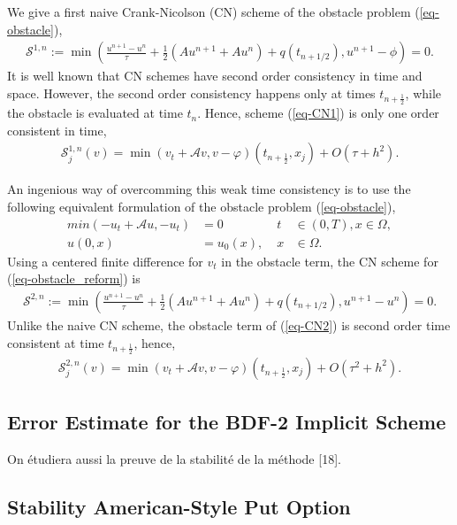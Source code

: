 \documentclass[12pt,a4paper]{article}
\begin{document}
We give a first naive Crank-Nicolson (CN) scheme of the obstacle problem (\ref{eq-obstacle}),
\begin{align}
\mathcal{S}^{1,n} := \min \left( \frac{u^{n+1}-u^n}{\tau} + \frac{1}{2} (Au^{n+1} + Au^{n}) + q(t_{n+1/2}), u^{n+1} - \phi \right) = 0. \label{eq-CN1}
\end{align}
It is well known that CN schemes have second order consistency in time and space. However, the second order consistency happens only at times $t_{n+\frac{1}{2}}$, while the obstacle is evaluated at time $t_n$. Hence, scheme (\ref{eq-CN1}) is only one order consistent in time,
\begin{align*}
\mathcal{S}_j^{1,n} (v) = \min( v_t + \mathcal{A}v, v - \varphi) (t_{n+\frac{1}{2}}, x_j) + O(\tau + h^2).
\end{align*}

An ingenious way of overcomming this weak time consistency is to use the following equivalent formulation of the obstacle problem (\ref{eq-obstacle}),
\begin{align}
	min( -u_t + \mathcal{A}u, -u_t) &= 0 \; &t &\in (0,T), x \in \Omega, \label{eq-obstacle_reform}\\
	u(0, x) &= u_0(x), \; & x &\in \Omega \nonumber.
\end{align}
Using a centered finite difference for $v_t$ in the obstacle term, the CN scheme for (\ref{eq-obstacle_reform}) is
\begin{align}
\mathcal{S}^{2,n} := \min \left( \frac{u^{n+1}-u^n}{\tau} + \frac{1}{2} (Au^{n+1} + Au^{n}) + q(t_{n+1/2}), u^{n+1} - u^{n} \right) = 0. \label{eq-CN2}
\end{align}
Unlike the naive CN scheme, the obstacle term of (\ref{eq-CN2}) is second order time consistent at time $t_{n+\frac{1}{2}}$, hence,
\begin{align*}
\mathcal{S}_j^{2,n} (v) = \min( v_t + \mathcal{A}v, v - \varphi) (t_{n+\frac{1}{2}}, x_j) + O(\tau^2 + h^2).
\end{align*}

		\subsection{Error Estimate for the BDF-2 Implicit Scheme}

On étudiera aussi la preuve de la stabilité de la méthode [18].

		\subsection{Stability American-Style Put Option}
\end{document}
